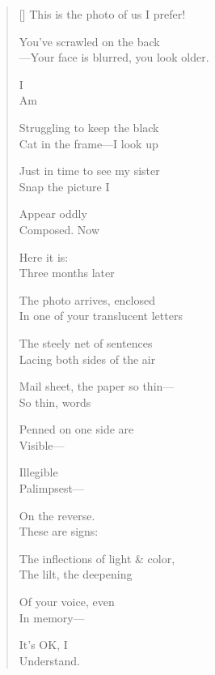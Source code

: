 \label{ch:letter}
\settowidth{\versewidth}{In one of your translucent letters}
\begin{verse}[\versewidth]
This is the photo of us I prefer!

You've scrawled on the back\\
---Your face is blurred, you look older.    

                                   I\\
Am

Struggling to keep the black\\
Cat in the frame---I look up

Just in time to see my sister\\
Snap       the picture            I

Appear oddly\\
Composed.             Now

Here it is:\\
Three months later

The photo arrives, enclosed\\
In one of your translucent letters

The steely net of sentences\\
Lacing both sides of the air

Mail sheet, the paper so thin---\\
So thin, words

Penned on one side are\\
Visible---

Illegible\\
Palimpsest---

On the reverse.\\
These are signs:

The inflections of light \& color,\\
The lilt, the deepening

Of your voice, even\\
In memory---

It's OK, I\\
Understand.
\end{verse}
